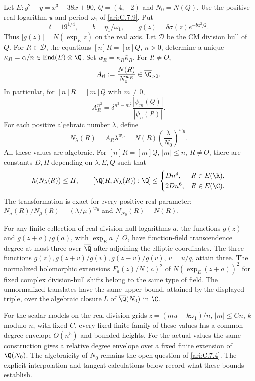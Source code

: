 
\begin{proposition}\label{ari:C.7.12}
Let $E:y^2+y=x^3-38x+90$, $Q=(4,-2)$ and $N_0=N(Q)$.
Use the positive real logarithm $u$ and period $\omega_1$ of
\ref{ari:C.7.9}. Put
\[
 \delta=19^{1/4},\qquad b=\eta_1/\omega_1,\qquad
 g(z)=\delta\sigma(z)e^{-bz^2/2}.
\]
Thus $|g(z)|=N(\exp_Ez)$ on the real axis. Let $\mathcal D$
be the CM division hull of $Q$. For $R\in\mathcal D$, the
equations $[n]R=[\alpha]Q$, $n>0$, determine a unique
$\kappa_R=\alpha/n\in\operatorname{End}(E)\otimes\Q$.
Set $w_R=\kappa_R\bar\kappa_R$. For $R\ne O$,
\[
 A_R:=\frac{N(R)}{N_0^{w_R}}\in\overline\Q_{>0}.
\]
In particular, for $[n]R=[m]Q$ with $m\ne0$,
\begin{equation}\label{ari:eq:division-ratio-model}
 A_R^{n^2}=\delta^{n^2-m^2}
                  \frac{|\psi_m(Q)|}{|\psi_n(R)|}.
\end{equation}
For each positive algebraic number $\lambda$, define
\[
 N_\lambda(R)=A_R\lambda^{w_R}
       =N(R)\left(\frac{\lambda}{N_0}\right)^{w_R}.
\]
All these values are algebraic. For $[n]R=[m]Q$, $|m|\le n$,
$R\ne O$, there are constants $D,H$ depending on $\lambda,E,Q$
such that
\[
 h(N_\lambda(R))\le H,\qquad
 [\Q(R,N_\lambda(R)):\Q]\le
 \begin{cases}Dn^4,&R\in E(\R),\\2Dn^6,&R\in E(\C).
 \end{cases}
\]
The transformation is exact for every positive real parameter:
$N_\lambda(R)/N_\mu(R)=(\lambda/\mu)^{w_R}$ and
$N_{N_0}(R)=N(R)$.

For any finite collection of real division-hull logarithms $a$,
the functions $g(z)$ and $g(z+a)/g(a)$, with $\exp_Ea\ne O$,
have function-field transcendence degree at most three over
$\overline\Q$ after adjoining the elliptic coordinates.
The three functions $g(z),g(z+v)/g(v),g(z-v)/g(v)$, $v=u/q$,
attain three. The normalized holomorphic extensions
$F_a(z)/N(a)^2$ of $N(\exp_E(z+a))^2$ for fixed complex
division-hull shifts belong to the same type of field.
The unnormalized translates have the same upper bound, attained by
the displayed triple, over the algebraic closure $L$ of $\overline\Q(N_0)$ in $\C$.

For the scalar models on the real division grids
$z=(mu+k\omega_1)/n$, $|m|\le Cn$, $k$ modulo $n$, with
fixed $C$, every fixed finite family of these values has a common
degree envelope $O(n^5)$ and bounded heights. For the actual values the same construction
gives a relative degree envelope over a fixed finite extension
of $\Q(N_0)$. The algebraicity of $N_0$ remains the open question
of \ref{ari:C.7.4}. The explicit interpolation and tangent
calculations below record what these bounds establish.
\end{proposition}
